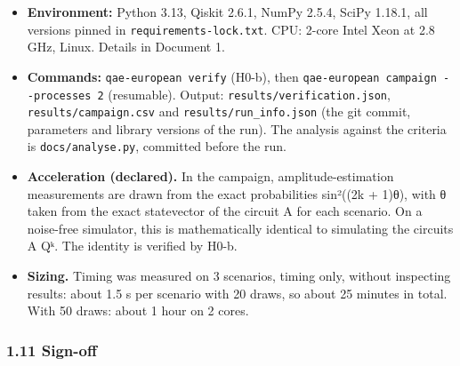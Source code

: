 \documentclass[
  10pt,
]{article}
\providecommand{\tightlist}{%
  \setlength{\itemsep}{0pt}\setlength{\parskip}{0pt}}
\begin{document}
\begin{itemize}
\tightlist
\item
  \textbf{Environment:} Python 3.13, Qiskit 2.6.1, NumPy 2.5.4, SciPy
  1.18.1, all versions pinned in \texttt{requirements-lock.txt}. CPU:
  2-core Intel Xeon at 2.8 GHz, Linux. Details in Document 1.
\item
  \textbf{Commands:} \texttt{qae-european\ verify} (H0-b), then
  \texttt{qae-european\ campaign\ -\/-processes\ 2} (resumable). Output:
  \texttt{results/verification.json}, \texttt{results/campaign.csv} and
  \texttt{results/run\_info.json} (the git commit, parameters and
  library versions of the run). The analysis against the criteria is
  \texttt{docs/analyse.py}, committed before the run.
\item
  \textbf{Acceleration (declared).} In the campaign,
  amplitude-estimation measurements are drawn from the exact
  probabilities sin²((2k + 1)θ), with θ taken from the exact statevector
  of the circuit A for each scenario. On a noise-free simulator, this is
  mathematically identical to simulating the circuits A Qᵏ. The identity
  is verified by H0-b.
\item
  \textbf{Sizing.} Timing was measured on 3 scenarios, timing only,
  without inspecting results: about 1.5 s per scenario with 20 draws, so
  about 25 minutes in total. With 50 draws: about 1 hour on 2 cores.
\end{itemize}

\hypertarget{111-sign-off}{%
\subsubsection{1.11 Sign-off}\label{111-sign-off}}
\end{document}
